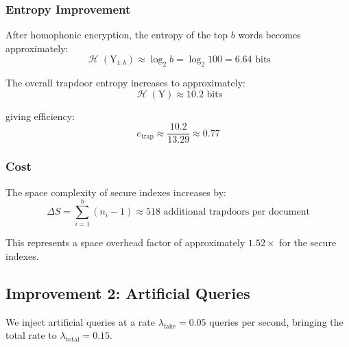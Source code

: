 \documentclass[final,11pt]{article}
\newcommand{\rv}[1]{\mathrm{#1}}
\newcommand{\entropy}{\operatorname{\mathcal{H}}}
\numberwithin{equation}{section}
\theoremstyle{plain}
\theoremstyle{remark}
\begin{document}
\subsubsection{Entropy Improvement}
After homophonic encryption, the entropy of the top $b$ words becomes approximately:
\begin{equation}
    \entropy(\rv{Y}_{1:b}) \approx \log_2 b = \log_2 100 = 6.64 \text{ bits}
\end{equation}

The overall trapdoor entropy increases to approximately:
\begin{equation}
    \entropy(\rv{Y}) \approx 10.2 \text{ bits}
\end{equation}

giving efficiency:
\begin{equation}
    e_{\text{trap}} \approx \frac{10.2}{13.29} \approx 0.77
\end{equation}

\subsubsection{Cost}
The space complexity of secure indexes increases by:
\begin{equation}
    \Delta S = \sum_{i=1}^{b} (n_i - 1) \approx 518 \text{ additional trapdoors per document}
\end{equation}

This represents a space overhead factor of approximately $1.52\times$ for the secure indexes.

\subsection{Improvement 2: Artificial Queries}
We inject artificial queries at a rate $\lambda_{\text{fake}} = 0.05$ queries per second, bringing the total rate to $\lambda_{\text{total}} = 0.15$.
\end{document}
